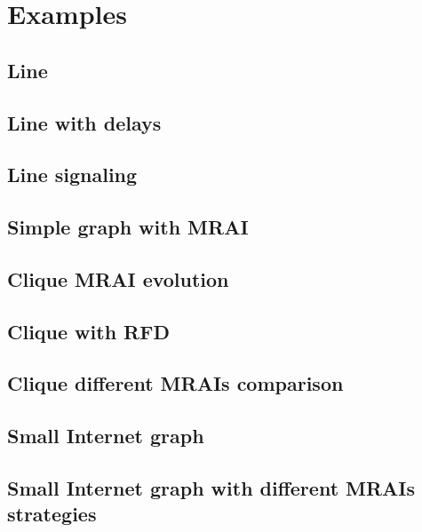 \documentclass[10pt,journal,onecolumn]{IEEEtran}
\begin{document}
\section{Examples}
\label{sec:examples}

\subsection{Line}
\label{subsec:ex_line}

\subsection{Line with delays}
\label{subsec:ex_line_delay}

\subsection{Line signaling}
\label{subsec:ex_line_signaling}

\subsection{Simple graph with MRAI}
\label{subsec:simple_graph_with_MRAI}

\subsection{Clique MRAI evolution}
\label{subsec:clique_evolution}

\subsection{Clique with RFD}
\label{subsec:clique_rfd}

\subsection{Clique different MRAIs comparison}
\label{subsec:clique_different_mrais}

\subsection{Small Internet graph}
\label{subsec:small_internet_graph}

\subsection{Small Internet graph with different MRAIs strategies}
\label{subsec:small_internet_graph_multiple_MRAIs}

\printindex


\end{document}
